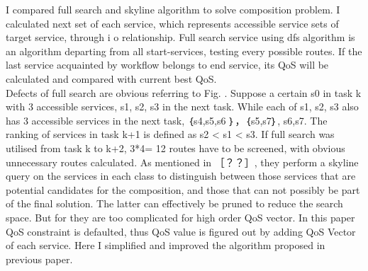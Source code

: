\documentclass[senior,final,11pt]{iscs-thesis}
\begin{document}

I compared full search and skyline algorithm to solve composition problem. I calculated next set of each service, which represents accessible service sets of target service, through i o relationship. Full search service using dfs algorithm is an algorithm departing from all start-services, testing every possible routes. If the last service acquainted by workflow belongs to end service, its QoS will be calculated and compared with current best QoS. \\
Defects of full search are obvious referring to Fig. . Suppose a certain s0 in task k with 3 accessible services, s1, s2, s3 in the next task. While each of s1, s2, s3 also has 3 accessible services in the next task, ｛s4,s5,s6  ｝，｛s5,s7｝, {s6,s7}. The ranking of services in task k+1 is defined as s2 < s1  < s3. If full search was utilised from task k to k+2, 3*4= 12 routes have to be screened, with obvious unnecessary routes calculated. As mentioned in ［？？］, they perform a skyline query on the services in each class to distinguish between those services that are potential candidates for the composition, and those that can not possibly be part of the final solution. The latter can effectively be pruned to reduce the search space. But for they are too complicated for high order QoS vector. In this paper QoS constraint is defaulted, thus QoS value is figured out by adding QoS Vector of each service. Here I simplified and improved the algorithm proposed in previous paper. 
\end{document}
